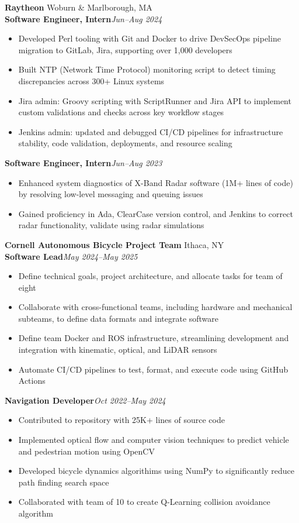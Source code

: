 \documentclass[letterpaper,10pt]{article}
\newcommand{\company}[2]{
    \vspace{3pt}
    {\large \textbf{#1}}
    \hfill
    {\normalsize {#2}}
    \\
}
\newcommand{\position}[2]{%
    \vspace{2pt}%
    \normalsize \leftRight{\textbf{#1}}{\textit{#2}}%
    \par%
}
\newcommand{\leftRight}[2]{%
  \leavevmode#1\hfill#2\par%
}
\newcommand{\itemsBegin}{
    \begin{itemize}[leftmargin=0.2in, labelsep=0.05in, itemsep=0pt, parsep=1pt, topsep=0pt, partopsep=0pt]
    \small
}
\newcommand{\itemsEnd}{\end{itemize}}
\begin{document}
    \company{Raytheon}{Woburn \& Marlborough, MA}

    \position{Software Engineer, Intern}{Jun--Aug 2024}
    \itemsBegin{}
        \item Developed Perl tooling with Git and Docker to drive DevSecOps pipeline migration to GitLab, Jira, supporting over 1,000 developers
        \item Built NTP (Network Time Protocol) monitoring script to detect timing discrepancies across 300+ Linux systems
        \item Jira admin: Groovy scripting with ScriptRunner and Jira API to implement custom validations and checks across key workflow stages
        \item Jenkins admin: updated and debugged CI/CD pipelines for infrastructure stability, code validation, deployments, and resource scaling
    \itemsEnd{}

    \position{Software Engineer, Intern}{Jun--Aug 2023}
    \itemsBegin{}
        \item Enhanced system diagnostics of X-Band Radar software (1M+ lines of code) by resolving low-level messaging and queuing issues
        \item Gained proficiency in Ada, ClearCase version control, and Jenkins to correct radar functionality, validate using radar simulations
    \itemsEnd{}

    \company{Cornell Autonomous Bicycle Project Team}{Ithaca, NY}

    \position{Software Lead}{May 2024--May 2025}
    \itemsBegin{}
        \item Define technical goals, project architecture, and allocate tasks for team of eight
        \item Collaborate with cross-functional teams, including hardware and mechanical subteams, to define data formats and integrate software
        \item Define team Docker and ROS infrastructure, streamlining development and integration with kinematic, optical, and LiDAR sensors
        \item Automate CI/CD pipelines to test, format, and execute code using GitHub Actions
    \itemsEnd{}

    \position{Navigation Developer}{Oct 2022--May 2024}
    \itemsBegin{}
        \item Contributed to repository with 25K+ lines of source code
        \item Implemented optical flow and computer vision techniques to predict vehicle and pedestrian motion using OpenCV
        \item Developed bicycle dynamics algorithims using NumPy to significantly reduce path finding search space
        \item Collaborated with team of 10 to create Q-Learning collision avoidance algorithm
    \itemsEnd{}
\end{document}
